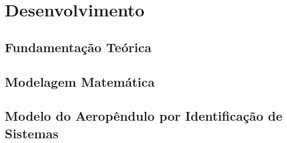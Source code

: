 \chapter{Desenvolvimento}


\section{ Fundamentação Teórica}


\section{Modelagem Matemática}


\section{Modelo do Aeropêndulo por Identificação de Sistemas}
